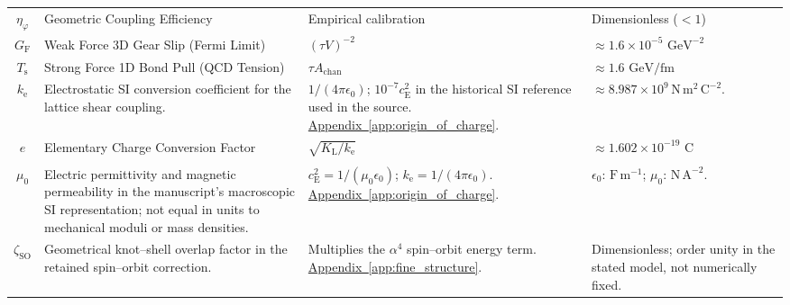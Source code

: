 \begin{longtable}{@{} c p{5.5cm} p{4cm} p{3.5cm} @{}}
$\eta_{\varphi}$ & Geometric Coupling Efficiency & Empirical calibration & Dimensionless ($<1$) \\

$G_{\mathrm{F}}$ & Weak Force 3D Gear Slip (Fermi Limit) & $(\tau V)^{-2}$ & $\approx 1.6 \times 10^{-5} \text{ GeV}^{-2}$ \\

$T_{\mathrm{s}}$ & Strong Force 1D Bond Pull (QCD Tension) & $\tau A_{\mathrm{chan}}$ & $\approx 1.6 \text{ GeV/fm}$ \\

$k_{\mathrm e}$ & {\raggedright Electrostatic SI conversion coefficient for the lattice shear coupling.\par} & {\raggedright $1/(4\pi\epsilon_0)$; $10^{-7}c_{\mathrm E}^2$ in the historical SI reference used in the source. \newline \hyperref[app:origin_of_charge]{Appendix~\ref*{app:origin_of_charge}}.\par} & {\raggedright $\approx8.987\times10^9\,\mathrm{N\,m^2\,C^{-2}}$.\par} \\

$e$ & Elementary Charge Conversion Factor & $\sqrt{K_{\mathrm{L}} / k_{\mathrm{e}}}$ & $\approx 1.602 \times 10^{-19} \text{ C}$ \\

\begin{tabular}[c]{@{}c@{}}$\epsilon_0$ \\ $\mu_0$\end{tabular} & {\raggedright Electric permittivity and magnetic permeability in the manuscript's macroscopic SI representation; not equal in units to mechanical moduli or mass densities.\par} & {\raggedright $c_{\mathrm E}^2=1/(\mu_0\epsilon_0)$; $k_{\mathrm e}=1/(4\pi\epsilon_0)$. \newline \hyperref[app:origin_of_charge]{Appendix~\ref*{app:origin_of_charge}}.\par} & {\raggedright $\epsilon_0$: $\mathrm{F\,m^{-1}}$; $\mu_0$: $\mathrm{N\,A^{-2}}$.\par} \\

$\zeta_{\mathrm{SO}}$ & {\raggedright Geometrical knot--shell overlap factor in the retained spin--orbit correction.\par} & {\raggedright Multiplies the $\alpha^4$ spin--orbit energy term. \newline \hyperref[app:fine_structure]{Appendix~\ref*{app:fine_structure}}.\par} & {\raggedright Dimensionless; order unity in the stated model, not numerically fixed.\par} \\



\end{longtable}
